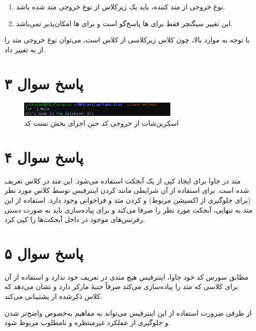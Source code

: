 \documentclass{article}
\begin{document}
\begin{enumerate}
    \item نوع خروجی از متد کننده، باید یک زیرکلاس از نوع خروجی متد شده باشد.
    \item این تغییر سیگنچر فقط برای ها پاسخ‌گو است و برای ها امکان‌پذیر نمی‌باشد.
\end{enumerate}

با توجه به موارد بالا، چون کلاس  زیرکلاسی از کلاس  است، می‌توان نوع خروجی متد  را از  به  تغییر داد.

\section*{پاسخ سوال ۳}

\begin{figure}[h]
\begin{latin}
    \centering
    \includegraphics[width=0.7\textwidth]{../img/screenshot1.png}
\end{latin}
    \caption*{اسکرین‌شات از خروجی کد حین اجرای بخش تست کد}
\end{figure}

\section*{پاسخ سوال ۴}

متد  در جاوا برای ایجاد کپی از یک آبجکت استفاده می‌شود. این متد در کلاس  تعریف شده است. برای استفاده از آن شرایطی مانند  کردن اینترفیس  توسط کلاس مورد نظر (برای جلوگیری از اکسپشن مربوط) و  کردن متد  و فراخوانی  وجود دارد. استفاده از این متد به تنهایی، آبجکت مورد نظر را صرفا  می‌کند و برای پیاده‌سازی  باید به صورت دستی رفرنس‌های موجود در داخل آبجکت‌ها را کپی کرد.

\section*{پاسخ سوال ۵}

مطابق سورس کد خود جاوا، اینترفیس  هیچ متدی در تعریف خود ندارد و استفاده از آن برای کلاسی که متد  را پیاده‌سازی می‌کند صرفاً جنبۀ مارکر دارد و نشان می‌دهد که کلاس ذکرشده از  پشتیبانی می‌کند.

از طرفی ضرورت استفاده از این اینترفیس می‌تواند به مفاهیم  به‌خصوص واضح‌تر شدن و جلوگیری از عملکرد غیرمنتظره و نامطلوب مربوط شود.
\end{document}
